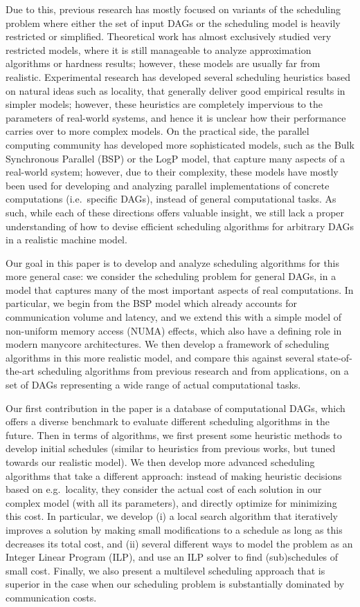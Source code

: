 \documentclass[sigconf,nonacm]{acmart}
\begin{document}
Due to this, previous research has mostly focused on variants of the scheduling problem where either the set of input DAGs or the scheduling model is heavily restricted or simplified. Theoretical work has almost exclusively studied very restricted models, where it is still manageable to analyze approximation algorithms or hardness results; however, these models are usually far from realistic. Experimental research has developed several scheduling heuristics based on natural ideas such as locality, that generally deliver good empirical results in simpler models; however, these heuristics are completely impervious to the parameters of real-world systems, and hence it is unclear how their performance carries over to more complex models. On the practical side, the parallel computing community has developed more sophisticated models, such as the Bulk Synchronous Parallel (BSP) or the LogP model, that capture many aspects of a real-world system; however, due to their complexity, these models have mostly been used for developing and analyzing parallel implementations of concrete computations (i.e.\ specific DAGs), instead of general computational tasks. As such, while each of these directions offers valuable insight, we still lack a proper understanding of how to devise efficient scheduling algorithms for arbitrary DAGs in a realistic machine model.

Our goal in this paper is to develop and analyze scheduling algorithms for this more general case: we consider the scheduling problem for general DAGs, in a model that captures many of the most important aspects of real computations. In particular, we begin from the BSP model which already accounts for communication volume and latency, and we extend this with a simple model of non-uniform memory access (NUMA) effects, which also have a defining role in modern manycore architectures. We then develop a framework of scheduling algorithms in this more realistic model, and compare this against several state-of-the-art scheduling algorithms from previous research and from applications, on a set of DAGs representing a wide range of actual computational tasks.

Our first contribution in the paper is a database of computational DAGs, which offers a diverse benchmark to evaluate different scheduling algorithms in the future. Then in terms of algorithms, we first present some heuristic methods to develop initial schedules (similar to heuristics from previous works, but tuned towards our realistic model). We then develop more advanced scheduling algorithms that take a different approach: instead of making heuristic decisions based on e.g.\ locality, they consider the actual cost of each solution in our complex model (with all its parameters), and directly optimize for minimizing this cost. In particular, we develop (i) a local search algorithm that iteratively improves a solution by making small modifications to a schedule as long as this decreases its total cost, and (ii) several different ways to model the problem as an Integer Linear Program (ILP), and use an ILP solver to find (sub)schedules of small cost. Finally, we also present a multilevel scheduling approach that is superior in the case when our scheduling problem is substantially dominated by communication costs.
\end{document}
